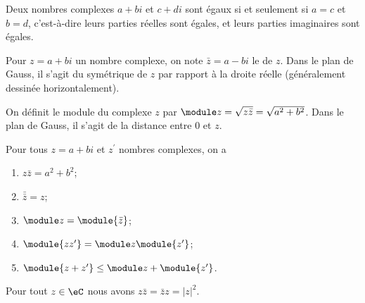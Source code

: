  Deux nombres complexes $a + bi$ et $c + di$ sont égaux si et seulement
 si $a = c$ et $b = d$, c'est-à-dire leurs parties réelles sont égales,
 et leurs parties imaginaires sont égales.

 Pour $z = a + bi$ un nombre complexe, on note $\bar z = a - bi$ le
  de $z$. Dans le plan de Gauss, il s'agit du
 symétrique de $z$ par rapport à la droite réelle (généralement
 dessinée horizontalement).

 On définit le module du complexe $z$ par $\module z = \sqrt{z\bar z} =
 \sqrt{a^2 + b^2}$. Dans le plan de Gauss, il s'agit de la distance
 entre $0$ et $z$.

\begin{proposition}
Pour tous $z = a+bi$ et $z^\prime$ nombres complexes, on a
   \begin{enumerate}
   \item $z \bar z = a^2 + b^2$;
   \item $\bar{\bar{z}} = z$;
   \item $\module z = \module {\bar z}$;
   \item $\module{zz^\prime} = \module z \module{z^\prime}$;
   \item $\module{z+z^\prime} \leq \module z + \module{z^\prime}$.
   \end{enumerate}
\end{proposition}

\begin{lemma}   \label{LEMooONLNooXLNbtB}
    Pour tout \( z\in \eC\) nous avons \( z\bar z=\bar z z=| z |^2\).
\end{lemma}
